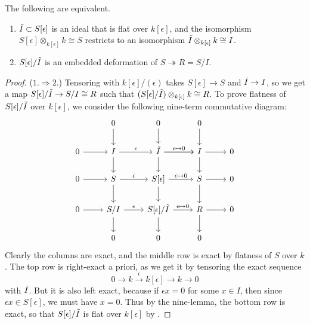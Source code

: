 \begin{lemma}
    The following are equivalent.
    \begin{enumerate}
        \item \(\tilde{I}\subset S[\epsilon]\) is an ideal that is flat over
            \(k[\epsilon]\), and the isomorphism
            \(S[\epsilon]\otimes_{k[\epsilon]} k \cong S\) restricts to an isomorphism
            \(\tilde{I}\otimes_{k[\epsilon]} k\cong I\).
        \item \(S[\epsilon]/\tilde{I}\) is an embedded deformation of
            \(S\twoheadrightarrow R=S/I\).
    \end{enumerate}
    \begin{proof}
        (\(1.\Rightarrow 2.\)) Tensoring with $k[\epsilon]/(\epsilon)$ takes
        $S[\epsilon]\to S$ and $\tilde{I}\to I$, so we get a map
        $S[\epsilon]/\tilde{I}\to S/I\cong R$ such that
        $(S[\epsilon]/\tilde{I})\otimes_{k[\epsilon]}k\cong R$. To prove flatness of
        $S[\epsilon]/\tilde{I}$ over $k[\epsilon]$, we consider the following
        nine-term commutative diagram: 
        \[\begin{tikzcd} 
        & 0 & 0 & 0 \\ 
            0 & {I} & {\t{I}} & I & 0 \\ 
            0 & {S} & {S[\epsilon]} & S & 0 \\ 
            0 & {S/I} & {S[\epsilon]/\t{I}} & R & 0 \\ 
              & 0 & 0 & 0 
              \arrow[from=2-1, to=2-2] 
              \arrow["\epsilon", from=2-2, to=2-3]
              \arrow["\epsilon\mapsto0", from=2-3, to=2-4]
	          \arrow[from=2-3, to=2-4]
	          \arrow[from=2-4, to=2-5]
	          \arrow[from=3-1, to=3-2]
	          \arrow["\epsilon", from=3-2, to=3-3]
	          \arrow["\epsilon\mapsto0", from=3-3, to=3-4]
	          \arrow[from=3-4, to=3-5]
	          \arrow[from=4-1, to=4-2]
	          \arrow["\epsilon", from=4-2, to=4-3]
	          \arrow["\epsilon\mapsto0", from=4-3, to=4-4]
	          \arrow[from=4-4, to=4-5]
	          \arrow[from=1-2, to=2-2]
	          \arrow[from=2-2, to=3-2]
	          \arrow[from=3-2, to=4-2]
	          \arrow[from=4-2, to=5-2]
	          \arrow[from=1-3, to=2-3]
	          \arrow[from=2-3, to=3-3]
	          \arrow[from=3-3, to=4-3]
	          \arrow[from=4-3, to=5-3]
	          \arrow[from=1-4, to=2-4]
	          \arrow[from=2-4, to=3-4]
	          \arrow[from=3-4, to=4-4]
	          \arrow[from=4-4, to=5-4] 
        \end{tikzcd}\] 
        Clearly the columns are exact, and the middle row is exact by flatness
        of \(S\) over \(k\). The top row is right-exact a priori, as we get it
        by tensoring the exact sequence 
        \[0\rightarrow k \xrightarrow{\;\epsilon\;} k[\epsilon] \longrightarrow
        k \rightarrow 0\]
        with $\tilde{I}$. But it is also left exact, because if $\epsilon x=0$ for
        some $x\in I$, then since $\epsilon x\in S[\epsilon]$, we must have
        $x=0$. Thus by the nine-lemma, the bottom row is exact, so that
        $S[\epsilon]/\tilde{I}$ is flat over $k[\epsilon]$ by .


\end{proof}
\end{lemma}
